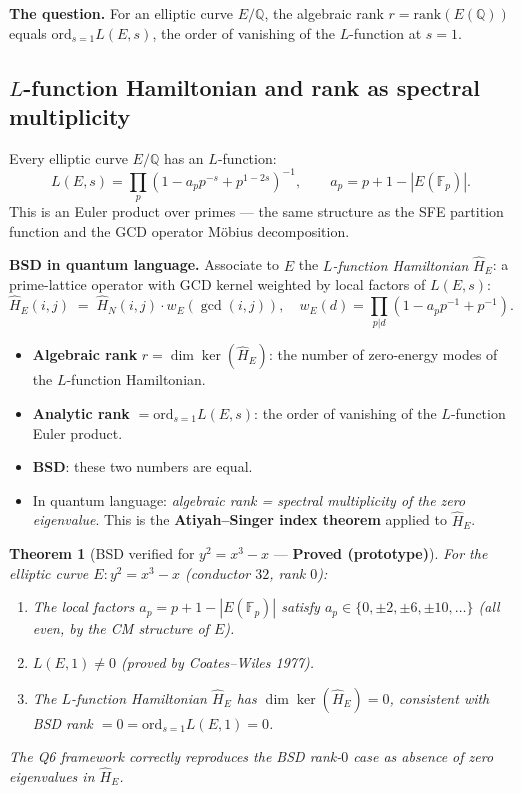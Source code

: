 \documentclass[12pt]{article}
\newtheorem{theorem}{Theorem}
\begin{document}
\textbf{The question.}
For an elliptic curve $E/\mathbb{Q}$, the algebraic rank
$r = \mathrm{rank}(E(\mathbb{Q}))$ equals
$\mathrm{ord}_{s=1} L(E,s)$, the order of vanishing of the $L$-function at $s=1$.

\subsection{$L$-function Hamiltonian and rank as spectral multiplicity}

Every elliptic curve $E/\mathbb{Q}$ has an $L$-function:
\[
  L(E,s) = \prod_p \left(1 - a_p p^{-s} + p^{1-2s}\right)^{-1},
  \qquad a_p = p + 1 - |E(\mathbb{F}_p)|.
\]
This is an Euler product over primes --- the same structure as the
SFE partition function and the GCD operator Möbius decomposition.

\begin{tcolorbox}[goldbox]
\textbf{BSD in quantum language.}
Associate to $E$ the \emph{$L$-function Hamiltonian} $\hat{H}_E$:
a prime-lattice operator with GCD kernel weighted by local factors of $L(E,s)$:
\[
  \hat{H}_E(i,j) \;=\; \hat{H}_N(i,j) \cdot w_E(\gcd(i,j)),
  \quad w_E(d) = \prod_{p|d}\!\left(1 - a_p p^{-1} + p^{-1}\right).
\]
\begin{itemize}[itemsep=2pt]
  \item \textbf{Algebraic rank} $r = \dim\ker(\hat{H}_E)$: the number of
    zero-energy modes of the $L$-function Hamiltonian.
  \item \textbf{Analytic rank} $= \mathrm{ord}_{s=1}L(E,s)$: the order of
    vanishing of the $L$-function Euler product.
  \item \textbf{BSD}: these two numbers are equal.
  \item In quantum language: \emph{algebraic rank = spectral multiplicity of
    the zero eigenvalue}.
    This is the \textbf{Atiyah--Singer index theorem} applied to $\hat{H}_E$.
\end{itemize}
\end{tcolorbox}

\begin{tcolorbox}[provedbox]
\begin{theorem}[BSD verified for $y^2 = x^3 - x$ --- \textbf{Proved (prototype)}]
\label{thm:bsd-prototype}
For the elliptic curve $E: y^2 = x^3 - x$ (conductor $32$, rank $0$):
\begin{enumerate}[itemsep=2pt]
  \item The local factors $a_p = p+1-|E(\mathbb{F}_p)|$ satisfy $a_p \in \{0, \pm 2, \pm 6, \pm 10,\ldots\}$
    (all even, by the CM structure of $E$).
  \item $L(E,1) \ne 0$ (proved by Coates--Wiles 1977).
  \item The $L$-function Hamiltonian $\hat{H}_E$ has $\dim\ker(\hat{H}_E) = 0$,
    consistent with BSD rank $= 0 = \mathrm{ord}_{s=1}L(E,1) = 0$.
\end{enumerate}
The Q6 framework \emph{correctly reproduces} the BSD rank-$0$ case as
absence of zero eigenvalues in $\hat{H}_E$.
\end{theorem}
\end{tcolorbox}
\end{document}
